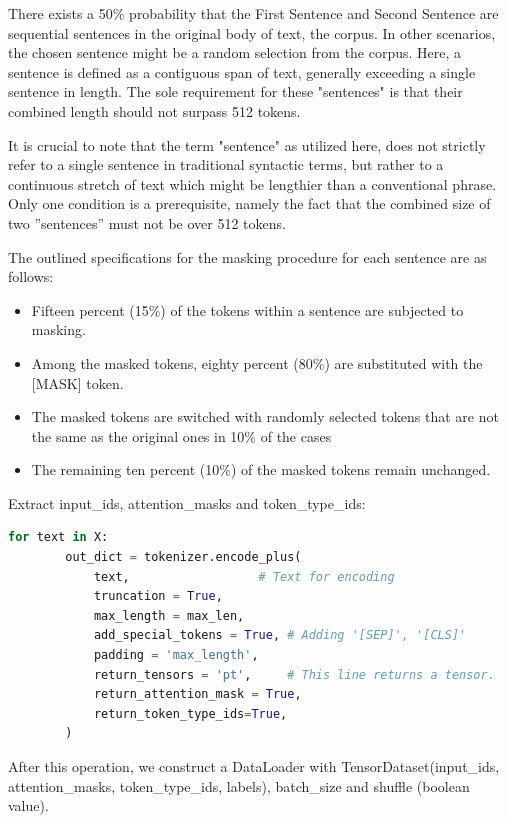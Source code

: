There exists a 50\% probability that the First Sentence and Second Sentence are sequential sentences in the original body of text, the corpus. In other scenarios, the chosen sentence might be a random selection from the corpus. Here, a sentence is defined as a contiguous span of text, generally exceeding a single sentence in length. The sole requirement for these "sentences" is that their combined length should not surpass 512 tokens.

It is crucial to note that the term "sentence" as utilized here, does not strictly refer to a single sentence in traditional syntactic terms, but rather to a continuous stretch of text which might be lengthier than a conventional phrase. Only one condition is a prerequisite, namely the fact that the combined size of two ”sentences” must not be over 512 tokens.

The outlined specifications for the masking procedure for each sentence are as follows:

\begin{itemize}
    \item Fifteen percent (15\%) of the tokens within a sentence are subjected to masking.
    \item Among the masked tokens, eighty percent (80\%) are substituted with the [MASK] token.
    \item The masked tokens are switched with randomly selected tokens that are not the same as the original ones in 10\% of the cases
    \item The remaining ten percent (10\%) of the masked tokens remain unchanged.
\end{itemize}

Extract input\_ids, attention\_masks and token\_type\_ids:

\begin{lstlisting}[language=Python]
    for text in X:
        out_dict = tokenizer.encode_plus(
            text,                  # Text for encoding
            truncation = True,
            max_length = max_len,
            add_special_tokens = True, # Adding '[SEP]', '[CLS]'
            padding = 'max_length',
            return_tensors = 'pt',     # This line returns a tensor.
            return_attention_mask = True,
            return_token_type_ids=True,
        )
\end{lstlisting}

After this operation, we construct a DataLoader with TensorDataset(input\_ids, attention\_masks, token\_type\_ids, labels), batch\_size and shuffle (boolean value).


